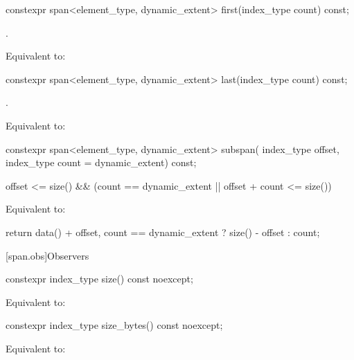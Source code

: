 %
\begin{itemdecl}
constexpr span<element_type, dynamic_extent> first(index_type count) const;
\end{itemdecl}
\begin{itemdescr}
\pnum
\requires
{}.

\pnum
\effects
Equivalent to: 
\end{itemdescr}

%
\begin{itemdecl}
constexpr span<element_type, dynamic_extent> last(index_type count) const;
\end{itemdecl}
\begin{itemdescr}
\pnum
\requires
{}.

\pnum
\effects
Equivalent to: 
\end{itemdescr}

%
\begin{itemdecl}
constexpr span<element_type, dynamic_extent> subspan(
  index_type offset, index_type count = dynamic_extent) const;
\end{itemdecl}
\begin{itemdescr}
\pnum
\requires
\begin{codeblock}
offset <= size() && (count == dynamic_extent || offset + count <= size())
\end{codeblock}

\pnum
\effects
Equivalent to:
\begin{codeblock}
return {data() + offset, count == dynamic_extent ? size() - offset : count};
\end{codeblock}
\end{itemdescr}

[span.obs]{Observers}

%
\begin{itemdecl}
constexpr index_type size() const noexcept;
\end{itemdecl}
\begin{itemdescr}
\pnum
\effects
Equivalent to: 
\end{itemdescr}

%
\begin{itemdecl}
constexpr index_type size_bytes() const noexcept;
\end{itemdecl}
\begin{itemdescr}
\pnum
\effects
Equivalent to: 
\end{itemdescr}

